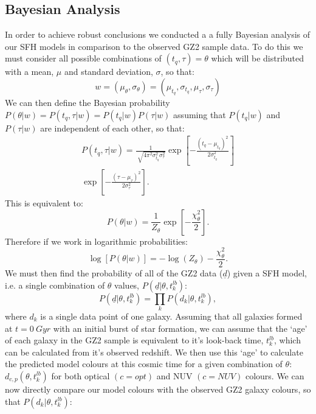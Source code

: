 \documentclass{mn2e}
\begin{document}
\subsection{Bayesian Analysis}\label{stats}
In order to achieve robust conclusions we conducted a a fully Bayesian analysis of our SFH models in comparison to the observed GZ2 sample data. To do this we must consider all possible combinations of $(t_{q}, \tau) = \theta$ which will be distributed with a mean, $\mu$ and standard deviation, $\sigma$, so that:
\begin{equation*}
w = (\mu_{\theta}, \sigma_{\theta}) = (\mu_{t_{q}}, \sigma_{t_{q}}, \mu_{\tau}, \sigma_{\tau})
\end{equation*}
We can then define the Bayesian probability $P(\theta|w) = P(t_{q}, \tau|w) = P(t_{q}|w)P(\tau|w)$ assuming that $ P(t_{q}|w)$ and $P(\tau|w)$ are independent of each other, so that:
\begin{multline*}
P(t_{q}, \tau|w) = \frac{1}{\sqrt[]{4\pi^2\sigma^2_{t_{q}}\sigma^2_{\tau}}} \exp\left[-\frac{(t_{q}-\mu_{t_{q}})^2}{2\sigma^2_{t_{q}}}\right] \\ \exp\left[-\frac{(\tau-\mu_{\tau})^2}{2\sigma^2_{\tau}}\right].
\end{multline*}
This is equivalent to:
\begin{equation*}
P(\theta|w) = \frac{1}{Z_{\theta}} \exp\left[-\frac{\chi_{\theta}^2}{2}\right].
\end{equation*}
Therefore if we work in logarithmic probabilities:
\begin{equation*}
\log[P(\theta|w)] = - \log(Z_{\theta}) - \frac{\chi_{\theta}^2}{2}.
\end{equation*}
We must then find the probability of all of the GZ2 data ($\underline{d}$) given a SFH model, i.e. a single combination of $\theta$ values, $P(\underline{d}|\theta, t_{k}^{lb})$:
\begin{equation*}
P(\underline{d}|\theta, t_{k}^{lb}) = \prod_{k} P(d_{k}|\theta, t_{k}^{lb}),
\end{equation*}
where $d_{k}$ is a single data point of one galaxy. Assuming that all galaxies formed at $t=0~Gyr$ with an initial burst of star formation, we can assume that the `age' of each galaxy in the GZ2 sample is equivalent to it's look-back time, $t^{lb}_{k}$, which can be calculated from it's observed redshift. We then use this  `age' to calculate the predicted model colours at this cosmic time for a given combination of $\theta$: $d_{c,p}(\theta, t^{lb}_{k})$ for both optical $(c=opt)$ and NUV $(c=NUV)$ colours. We can now directly compare our model colours with the observed GZ2 galaxy colours, so that $P(d_{k}|\theta, t^{lb}_{k})$:
\end{document}
